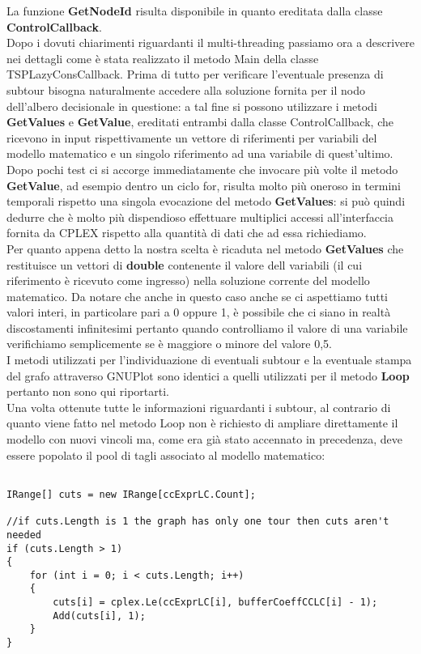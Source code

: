 \documentclass[11pt]{article}
\begin{document}
La funzione \textbf{GetNodeId} risulta disponibile in quanto ereditata dalla classe \textbf{ControlCallback}.\\
Dopo i dovuti chiarimenti riguardanti il multi-threading passiamo ora a descrivere nei dettagli come è stata realizzato il metodo Main della classe TSPLazyConsCallback. Prima di tutto per verificare l'eventuale presenza di subtour bisogna naturalmente accedere alla soluzione fornita per il nodo dell'albero decisionale in questione: a tal fine si possono utilizzare i metodi \textbf{GetValues} e \textbf{GetValue}, ereditati entrambi dalla classe ControlCallback, che ricevono in input rispettivamente un vettore di riferimenti per variabili del modello matematico e un singolo riferimento ad una variabile di quest'ultimo. Dopo pochi test ci si accorge immediatamente che invocare più volte il metodo \textbf{GetValue}, ad esempio dentro un ciclo for, risulta molto più oneroso in termini temporali rispetto una singola evocazione del metodo \textbf{GetValues}: si può quindi dedurre che è molto più dispendioso effettuare multiplici accessi all'interfaccia fornita da CPLEX rispetto alla quantità di dati che ad essa richiediamo.\\
Per quanto appena detto la nostra scelta è ricaduta nel metodo \textbf{GetValues} che restituisce un vettori di \textbf{double} contenente il valore dell variabili (il cui riferimento è ricevuto come ingresso) nella soluzione corrente del modello matematico. Da notare che anche in questo caso anche se ci aspettiamo tutti valori interi, in particolare pari a 0 oppure 1, è possibile che ci siano in realtà discostamenti infinitesimi pertanto quando controlliamo il valore di una variabile verifichiamo semplicemente se è maggiore o minore del valore 0,5.\\
I metodi utilizzati per l'individuazione di eventuali subtour e la eventuale stampa del grafo attraverso GNUPlot sono identici a quelli utilizzati per il metodo \textbf{Loop} pertanto non sono qui riportarti.\\
Una volta ottenute tutte le informazioni riguardanti i subtour, al contrario di quanto viene fatto nel metodo Loop non è richiesto di ampliare direttamente il modello con nuovi vincoli ma, come era già stato accennato in precedenza, deve essere popolato il pool di tagli associato al modello matematico:

\begin{lstlisting}

IRange[] cuts = new IRange[ccExprLC.Count];

//if cuts.Length is 1 the graph has only one tour then cuts aren't needed
if (cuts.Length > 1)
{
    for (int i = 0; i < cuts.Length; i++)
    {
        cuts[i] = cplex.Le(ccExprLC[i], bufferCoeffCCLC[i] - 1);
        Add(cuts[i], 1);
    }
}

\end{lstlisting}
\end{document}
